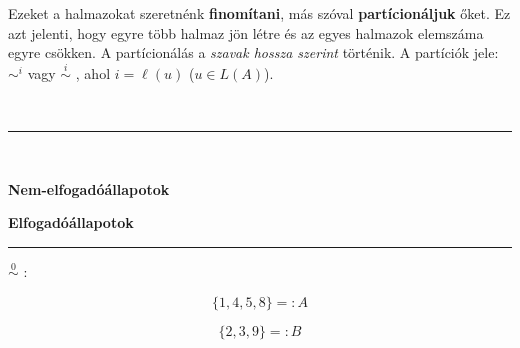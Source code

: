 \documentclass[a4paper,11pt]{article}
\newcommand{\partition}[1]{\stackrel{#1}{\sim}}
\begin{document}
Ezeket a halmazokat szeretnénk \textbf{finomítani}, más szóval \textbf{partícionáljuk} őket. Ez azt jelenti, hogy egyre több halmaz jön létre és az egyes halmazok elemszáma egyre csökken. A partícionálás a \textit{szavak hossza szerint} történik. A partíciók jele: $\boxed{\sim^i}$ vagy $\boxed{\partition{i}}$ , ahol $i = \ell(u)$ ($u \in L(A)$).

\newpage

~\\[-2em]
\hrule

\begin{minipage}{0.1\linewidth}
	~
\end{minipage}
\begin{minipage}{0.45\linewidth}
	\centering \textbf{Nem-elfogadóállapotok}
\end{minipage}
\begin{minipage}{0.45\linewidth}
	\centering \textbf{Elfogadóállapotok}
\end{minipage}

\hrule

\begin{minipage}{0.1\linewidth}
	$\partition{0}$ :
\end{minipage}
\begin{minipage}{0.45\linewidth}
	\[\{ 1,4,5,8 \} =: A\]
\end{minipage}
\begin{minipage}{0.45\linewidth}
	\[\{2,3,9\} =: B\]
\end{minipage}

\end{document}
